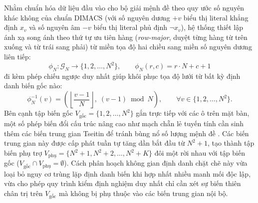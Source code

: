 Nhằm chuẩn hóa dữ liệu đầu vào cho bộ giải mệnh đề theo quy ước số nguyên khác
không của chuẩn DIMACS (với số nguyên dương $+v$ biểu thị literal khẳng định $x_v$
và số nguyên âm $-v$ biểu thị literal phủ định $\neg x_v$), hệ thống thiết lập ánh
xạ song ánh theo thứ tự ưu tiên hàng (\textit{row-major}, duyệt từng hàng từ trên
xuống và từ trái sang phải) từ miền tọa độ hai chiều sang miền số nguyên dương
liên tiếp:
\begin{equation}
    \phi_N : \mathcal{G}_N \to \{1, 2, \dots, N^2\}, \qquad
    \phi_N(r, c) = r \cdot N + c + 1
    \label{eq:var_map}
\end{equation}
đi kèm phép chiếu ngược duy nhất giúp khôi phục tọa độ lưới từ bất kỳ định danh
biến gốc nào:
\begin{equation}
    \phi_N^{-1}(v) = \left(
        \left\lfloor \frac{v - 1}{N} \right\rfloor,\; (v - 1) \bmod N
    \right), \qquad \forall v \in \{1, 2, \dots, N^2\}.
\end{equation}
Bên cạnh tập biến gốc $V_{\text{gốc}} = \{1, 2, \dots, N^2\}$ gắn trực tiếp với
các ô trên mặt bàn, một số phép biến đổi cấu trúc nâng cao như mạch chẵn lẻ tuyến
tính cần sinh thêm các biến trung gian Tseitin để tránh bùng nổ số lượng mệnh đề
\cite{tseitin1983complexity}. Các biến trung gian này được cấp phát tuần tự tăng
dần bắt đầu từ $N^2 + 1$, tạo thành tập biến phụ trợ $V_{\text{phụ}} = \{N^2 + 1,
N^2 + 2, \dots, N^2 + K\}$ đôi một rời nhau với tập biến gốc ($V_{\text{gốc}}
\cap V_{\text{phụ}} = \emptyset$). Cách phân hoạch không gian định danh chặt chẽ
này vừa loại bỏ nguy cơ trùng lặp định danh biến khi hợp nhất nhiều manh mối độc
lập, vừa cho phép quy trình kiểm định nghiệm duy nhất chỉ cần xét sự biến thiên
chân trị trên $V_{\text{gốc}}$ mà không bị phụ thuộc vào các biến trung gian nội
bộ.

